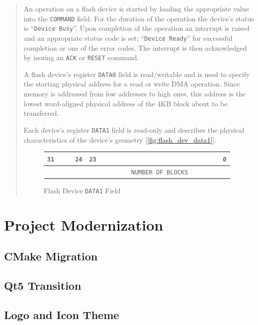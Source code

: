\documentclass[12pt,a4paper,openright,twoside]{report}
\begin{document}
\begin{quote}
	An operation on a flash device is started by loading the appropriate value into the \texttt{COMMAND} field. For the duration of the operation the device's status is ``\texttt{Device Busy}''.
	Upon completion of the operation an interrupt is raised and an appropriate status code is set; ``\texttt{Device Ready}'' for successful completion or one
of the error codes.
	The interrupt is then acknowledged by issuing an \texttt{ACK} or \texttt{RESET} command.

	A flash device’s register \texttt{DATA0} field is read/writable and is used to specify the starting physical address for a read or write DMA operation.
	Since memory is addressed from low addresses to high ones, this address is the lowest word-aligned physical address of the 4KB block about to be transferred.

	Each device's register \texttt{DATA1} field is read-only and describes the physical characteristics of the device's geometry [\autoref{fig:flash_dev_data1}].
	\begin{figure}[h]
	\centering
	\begin{tabularx}{\textwidth}{XXXXXXXXXXXXXXXX}
	\texttt{31} & & & \multicolumn{1}{r}{\texttt{24}} & \texttt{23} & & & & & & & & & & & \multicolumn{1}{r}{\texttt{0}} \\ \hline
	\multicolumn{1}{|l}{\cellcolor{gray}} & \cellcolor{gray} & \cellcolor{gray} & \multicolumn{1}{l|}{\cellcolor{gray}} & & & & & & \multicolumn{2}{l}{\texttt{NUMBER OF BLOCKS}} & & & & & \multicolumn{1}{l|}{} \\ \hline
	\end{tabularx}
	\caption{Flash Device \texttt{DATA1} Field}
	\label{fig:flash_dev_data1}
	\end{figure}
	\end{quote}

\chapter{Project Modernization}
\lhead[\fancyplain{}{\bfseries\thepage}]{\fancyplain{}{\bfseries\rightmark}}
\section{CMake Migration}
\section{Qt5 Transition}
\section{Logo and Icon Theme}
\end{document}
